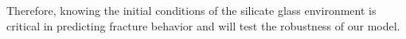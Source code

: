 Therefore, knowing the initial conditions of the silicate glass environment is critical in predicting fracture behavior and  will test the robustness of our model.

